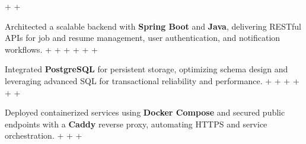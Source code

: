 \documentclass[letterpaper,10pt]{article}                                                                                                                                                                                                                                                                                                                                                                                                                                                                                                                                                                         +
\newcommand{\resumeItem}[1]{                                                                                                                                                                                                                                                                                                                                                                                                                                                                                                                                                                                      +
                                                                                                                                                                                                                                                                                                                                                                                                                                                                                                                                                                                                                   +
   \item\small{#1}\vspace{-3pt}                                                                                                                                                                                                                                                                                                                                                                                                                                                                                                                                                                                    +
                                                                                                                                                                                                                                                                                                                                                                                                                                                                                                                                                                                                                   +
 }                                                                                                                                                                                                                                                                                                                                                                                                                                                                                                                                                                                                                 +
\begin{document}
     \resumeItem{Architected a scalable backend with \textbf{Spring Boot} and \textbf{Java}, delivering RESTful APIs for job and resume management, user authentication, and notification workflows.}                                                                                                                                                                                                                                                                                                                                                                                                              +
                                                                                                                                                                                                                                                                                                                                                                                                                                                                                                                                                                                                                   +
     \resumeItem{Integrated \textbf{PostgreSQL} for persistent storage, optimizing schema design and leveraging advanced SQL for transactional reliability and performance.}                                                                                                                                                                                                                                                                                                                                                                                                                                       +
                                                                                                                                                                                                                                                                                                                                                                                                                                                                                                                                                                                                                   +
     \resumeItem{Deployed containerized services using \textbf{Docker Compose} and secured public endpoints with a \textbf{Caddy} reverse proxy, automating HTTPS and service orchestration.}                                                                                                                                                                                                                                                                                                                                                                                                                      +
\end{document}
